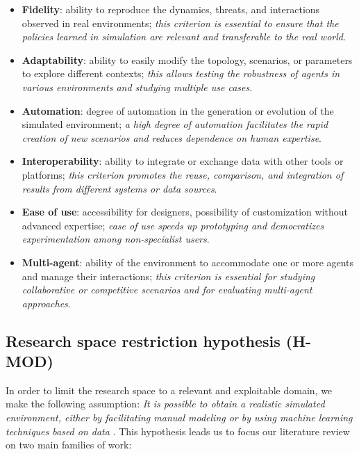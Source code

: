 \begin{itemize}
  \item \textbf{Fidelity}: ability to reproduce the dynamics, threats, and interactions observed in real environments; \emph{this criterion is essential to ensure that the policies learned in simulation are relevant and transferable to the real world}.
  \item \textbf{Adaptability}: ability to easily modify the topology, scenarios, or parameters to explore different contexts; \emph{this allows testing the robustness of agents in various environments and studying multiple use cases}.
  \item \textbf{Automation}: degree of automation in the generation or evolution of the simulated environment; \emph{a high degree of automation facilitates the rapid creation of new scenarios and reduces dependence on human expertise}.
  \item \textbf{Interoperability}: ability to integrate or exchange data with other tools or platforms; \emph {this criterion promotes the reuse, comparison, and integration of results from different systems or data sources}.
  \item \textbf{Ease of use}: accessibility for designers, possibility of customization without advanced expertise; \emph{ease of use speeds up prototyping and democratizes experimentation among non-specialist users}.
  \item \textbf{Multi-agent}: ability of the environment to accommodate one or more agents and manage their interactions; \emph{this criterion is essential for studying collaborative or competitive scenarios and for evaluating multi-agent approaches}.
\end{itemize}

\subsection*{Research space restriction hypothesis (\textbf{H-MOD})}

In order to limit the research space to a relevant and exploitable domain, we make the following assumption: \textit{It is possible to obtain a realistic simulated environment, either by facilitating manual modeling or by using machine learning techniques based on data} . This hypothesis leads us to focus our literature review on two main families of work:

